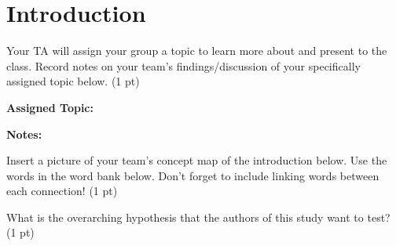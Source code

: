 \documentclass[12pt,a4paper]{article}
\begin{document}
\section*{Introduction}
\begin{enumerate}[font=\bfseries, wide]
    {\color{under}\item Your TA will assign your group a topic to learn more about and present to the class. Record notes on your team’s findings/discussion of your specifically assigned topic below. (1 pt)}
    
    \textbf{Assigned Topic:}

    \textbf{Notes:}
    
    {\color{under}\item Insert a picture of your team’s concept map of the introduction below. Use the words in the word bank below. Don’t forget to include linking words between each connection!   (1 pt)}
    
    
    {\color{under}\item What is the overarching hypothesis that the authors of this study want to test? (1 pt)}
    
    
\end{enumerate}
\end{document}
